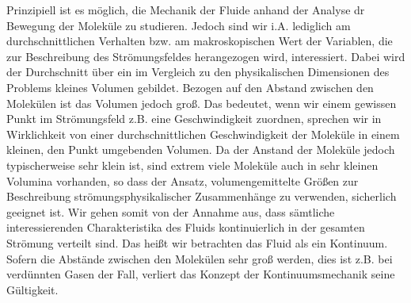 \documentclass{lecture}
\begin{document}
    Prinzipiell ist es möglich, die Mechanik der Fluide anhand der Analyse dr Bewegung der Moleküle zu studieren.
    Jedoch sind wir i.A. lediglich am durchschnittlichen Verhalten bzw. am makroskopischen Wert der Variablen, die zur Beschreibung des Strömungsfeldes herangezogen wird, interessiert.
    Dabei wird der Durchschnitt über ein im Vergleich zu den physikalischen Dimensionen des Problems kleines Volumen gebildet.
    Bezogen auf den Abstand zwischen den Molekülen ist das Volumen jedoch groß.
    Das bedeutet, wenn wir einem gewissen Punkt im Strömungsfeld z.B. eine Geschwindigkeit zuordnen, sprechen wir in Wirklichkeit von einer durchschnittlichen Geschwindigkeit der Moleküle in einem kleinen, den Punkt umgebenden Volumen.
    Da der Anstand der Moleküle jedoch typischerweise sehr klein ist, sind extrem viele Moleküle auch in sehr kleinen Volumina vorhanden, so dass der Ansatz, volumengemittelte Größen zur Beschreibung strömungsphysikalischer Zusammenhänge zu verwenden, sicherlich geeignet ist.
    Wir gehen somit von der Annahme aus, dass sämtliche interessierenden Charakteristika des Fluids kontinuierlich in der gesamten Strömung verteilt sind.
    Das heißt wir betrachten das Fluid als ein Kontinuum.
    Sofern die Abstände zwischen den Molekülen sehr groß werden, dies ist z.B. bei verdünnten Gasen der Fall, verliert das Konzept der Kontinuumsmechanik seine Gültigkeit.
\end{document}
